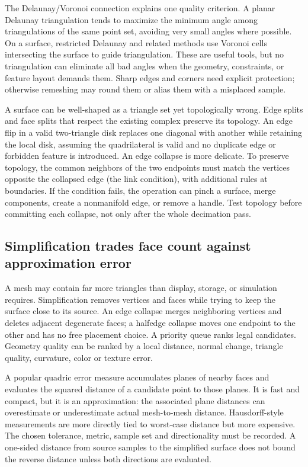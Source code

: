 The Delaunay/Voronoi connection explains one quality criterion. A planar Delaunay triangulation tends to maximize the minimum angle among triangulations of the same point set, avoiding very small angles where possible. On a surface, restricted Delaunay and related methods use Voronoi cells intersecting the surface to guide triangulation. These are useful tools, but no triangulation can eliminate all bad angles when the geometry, constraints, or feature layout demands them. Sharp edges and corners need explicit protection; otherwise remeshing may round them or alias them with a misplaced sample.

A surface can be well-shaped as a triangle set yet topologically wrong. Edge splits and face splits that respect the existing complex preserve its topology. An edge flip in a valid two-triangle disk replaces one diagonal with another while retaining the local disk, assuming the quadrilateral is valid and no duplicate edge or forbidden feature is introduced. An edge collapse is more delicate. To preserve topology, the common neighbors of the two endpoints must match the vertices opposite the collapsed edge (the link condition), with additional rules at boundaries. If the condition fails, the operation can pinch a surface, merge components, create a nonmanifold edge, or remove a handle. Test topology before committing each collapse, not only after the whole decimation pass.

\subsection{Simplification trades face count against approximation error}\label{03-visual-computing-i-ch002-simplification-trades-face-count-against-approximation-error}

\hypertarget{03-visual-computing-i-ch002-simplification-trades-face-count-against-approximation-error}{}

A mesh may contain far more triangles than display, storage, or simulation requires. Simplification removes vertices and faces while trying to keep the surface close to its source. An edge collapse merges neighboring vertices and deletes adjacent degenerate faces; a halfedge collapse moves one endpoint to the other and has no free placement choice. A priority queue ranks legal candidates. Geometry quality can be ranked by a local distance, normal change, triangle quality, curvature, color or texture error.

A popular quadric error measure accumulates planes of nearby faces and evaluates the squared distance of a candidate point to those planes. It is fast and compact, but it is an approximation: the associated plane distances can overestimate or underestimate actual mesh-to-mesh distance. Hausdorff-style measurements are more directly tied to worst-case distance but more expensive. The chosen tolerance, metric, sample set and directionality must be recorded. A one-sided distance from source samples to the simplified surface does not bound the reverse distance unless both directions are evaluated.


